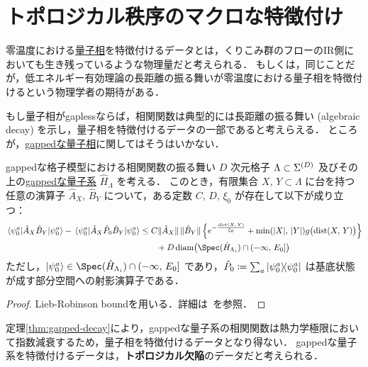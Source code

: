 \documentclass[TQFT_main]{subfiles}
\begin{document}
\section{トポロジカル秩序のマクロな特徴付け}

零温度における\hyperref[def:quantum-phase]{量子相}を特徴付けるデータとは，くりこみ群のフローのIR側においても生き残っているような物理量だと考えられる．
もしくは，同じことだが，低エネルギー有効理論の長距離の振る舞いが零温度における量子相を特徴付けるという物理学者の期待がある．

もし量子相がgaplessならば，相関関数は典型的には長距離の振る舞い (algebraic decay) を示し，量子相を特徴付けるデータの一部であると考えらえる．
ところが，\hyperref[def:quantum-phase]{gappedな量子相}に関してはそうはいかない．

\begin{mytheo}[label=thm:gapped-decay]{gappedな格子模型における相関関数の振る舞い}
    $D$ 次元格子 $\Lambda \subset \Sigma^{(D)}$ 及びその上の\hyperref[def:gapped]{gappedな量子系} $\hat{H}_\Lambda$ を考える．
    このとき，有限集合 $X,\, Y \subset \Lambda$ に台を持つ任意の演算子 $\hat{A}_X,\, \hat{B}_Y$ について，ある定数 $C,\, D,\, \xi_0$ が存在して以下が成り立つ：
    \begin{align}
        \mel{\psi_0^a}{\hat{A}_X \hat{B}_Y}{\psi_0^a} - \mel{\psi_0^a}{\hat{A}_X \hat{P}_0 \hat{B}_Y}{\psi_0^a} 
        &\le C  \norm*{\hat{A}_X} \norm*{\hat{B}_Y} \Bigl\{ e^{- \frac{\mathrm{dist} (X,\, Y)}{\xi_0}} + \min (\abs{X},\, \abs{Y}) g \bigl(\mathrm{dist} (X,\, Y) \bigr) \Bigr\} \\
        &\qquad + D\, \mathrm{diam}\bigl(\Spec (\hat{H}_{\Lambda_i}) \cap (-\infty,\, E_0] \bigr)
    \end{align}
    ただし，$\ket{\psi_0^a} \in \Spec (\hat{H}_{\Lambda_i}) \cap (-\infty,\, E_0]$ であり，$\hat{P}_0 \coloneqq \sum_a \ketbra{\psi_0^a}{\psi_0^a}$ は基底状態が成す部分空間への射影演算子である．
\end{mytheo}

\begin{proof}
    Lieb-Robinson boundを用いる．詳細は~\cite[Theorem 2, p.7]{Hastings2010localityquantumsystems}を参照．
\end{proof}

定理\ref{thm:gapped-decay}により，gappedな量子系の相関関数は熱力学極限において指数減衰するため，量子相を特徴付けるデータとなり得ない．
gappedな量子系を特徴付けるデータは，\textbf{トポロジカル欠陥}のデータだと考えられる．
\end{document}
